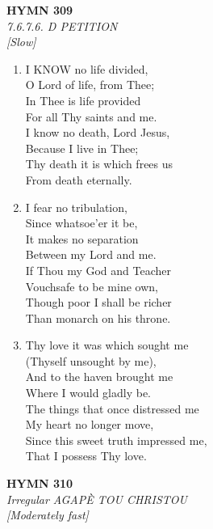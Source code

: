 \newpage
\begin{center}
    {\Large \textbf{HYMN 309}}
    \\
    \textit{7.6.7.6. D PETITION}
    \\
    \textit{\small [Slow]}
\end{center}
\vspace{1em}

\begin{enumerate}
    \item I KNOW no life divided, \\
        O Lord of life, from Thee; \\
        In Thee is life provided \\
        For all Thy saints and me. \\
        I know no death, Lord Jesus, \\
        Because I live in Thee; \\
        Thy death it is which frees us \\
        From death eternally.

    \item I fear no tribulation, \\
        Since whatsoe'er it be, \\
        It makes no separation \\
        Between my Lord and me. \\
        If Thou my God and Teacher \\
        Vouchsafe to be mine own, \\
        Though poor I shall be richer \\
        Than monarch on his throne.

    \item Thy love it was which sought me \\
        (Thyself unsought by me), \\
        And to the haven brought me \\
        Where I would gladly be. \\
        The things that once distressed me \\
        My heart no longer move, \\
        Since this sweet truth impressed me, \\
        That I possess Thy love.

\end{enumerate}

\newpage
\begin{center}
    {\Large \textbf{HYMN 310}}
    \\
    \textit{Irregular AGAP\`E TOU CHRISTOU}
    \\
    \textit{\small [Moderately fast]}
\end{center}
\vspace{1em}

